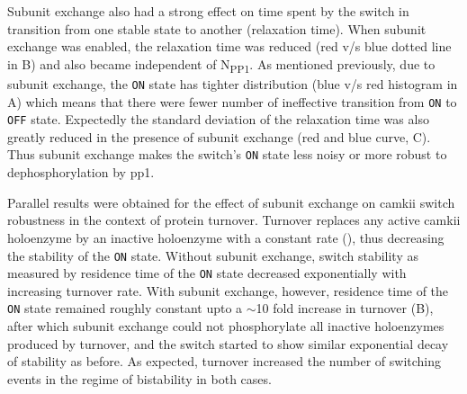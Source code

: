 \documentclass[9pt,lineno,doublespacing]{elife}
\newcommand\SUB[2]{#1\textsubscript{#2}}
\begin{document}
Subunit exchange also had a strong effect on time spent by the switch in
transition from one stable state to another (relaxation time). When subunit
exchange was enabled, the relaxation time was reduced (red v/s blue dotted line
in B) and also became independent of \SUB{N}{PP1}. As
mentioned previously, due to subunit exchange, the \texttt{ON} state has tighter
distribution (blue v/s red histogram in A) which means that
there were fewer number of ineffective transition from \texttt{ON} to
\texttt{OFF} state. Expectedly the standard deviation of the relaxation time was
also greatly reduced in the presence of subunit exchange (red and blue curve,
C). Thus subunit exchange makes the switch's \texttt{ON}
state less noisy or more robust to dephosphorylation by \gls{pp1}.

Parallel results were obtained for the effect of subunit exchange on
\gls{camkii} switch robustness in the context of protein turnover. Turnover
replaces any active \gls{camkii} holoenzyme by an inactive holoenzyme with a
constant rate (), thus decreasing the stability of the \texttt{ON}
state. Without subunit exchange, switch stability as measured by residence time
of the \texttt{ON} state decreased exponentially with increasing turnover rate.
With subunit exchange, however, residence time of the \texttt{ON} state remained
roughly constant upto a $\sim$10 fold increase in turnover (B),
after which subunit exchange could not phosphorylate all inactive holoenzymes
produced by turnover, and the switch started to show similar exponential decay
of stability as before. As expected, turnover increased the number of switching
events in the regime of bistability in both cases.
\end{document}
